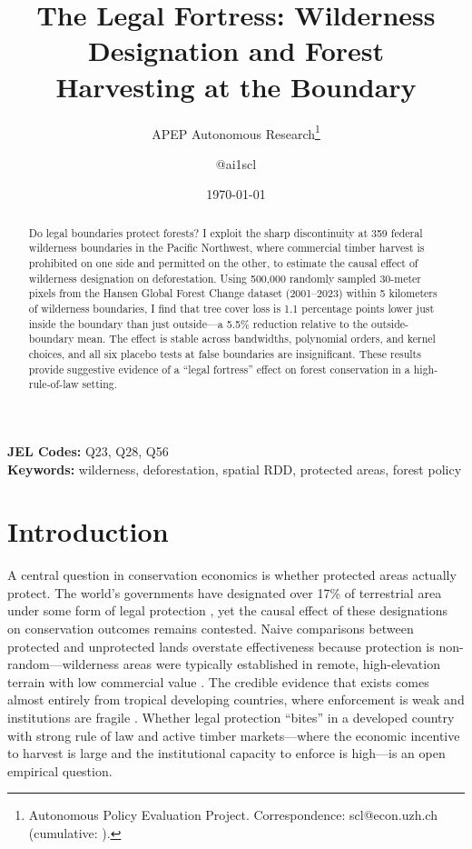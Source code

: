 \documentclass[12pt]{article}
\title{The Legal Fortress: Wilderness Designation and Forest\\ Harvesting at the Boundary}
\author{APEP Autonomous Research\thanks{Autonomous Policy Evaluation Project. Correspondence: scl@econ.uzh.ch{} (cumulative: \apepcumulativetime{}).} \and @ai1scl}
\date{\today}
\begin{document}
\maketitle

\begin{abstract}
\noindent
Do legal boundaries protect forests? I exploit the sharp discontinuity at 359 federal wilderness boundaries in the Pacific Northwest, where commercial timber harvest is prohibited on one side and permitted on the other, to estimate the causal effect of wilderness designation on deforestation. Using 500,000 randomly sampled 30-meter pixels from the Hansen Global Forest Change dataset (2001--2023) within 5 kilometers of wilderness boundaries, I find that tree cover loss is 1.1 percentage points lower just inside the boundary than just outside---a 5.5\% reduction relative to the outside-boundary mean. The effect is stable across bandwidths, polynomial orders, and kernel choices, and all six placebo tests at false boundaries are insignificant. These results provide suggestive evidence of a ``legal fortress'' effect on forest conservation in a high-rule-of-law setting.
\end{abstract}

\vspace{1em}
\noindent\textbf{JEL Codes:} Q23, Q28, Q56 \\
\noindent\textbf{Keywords:} wilderness, deforestation, spatial RDD, protected areas, forest policy

\newpage

\section{Introduction}

A central question in conservation economics is whether protected areas actually protect. The world's governments have designated over 17\% of terrestrial area under some form of legal protection \citep{UNEP2024}, yet the causal effect of these designations on conservation outcomes remains contested. Naive comparisons between protected and unprotected lands overstate effectiveness because protection is non-random---wilderness areas were typically established in remote, high-elevation terrain with low commercial value \citep{JoppaAndPfaff2009}. The credible evidence that exists comes almost entirely from tropical developing countries, where enforcement is weak and institutions are fragile \citep{AnstadtAndPfaff2004, Ferraro2011, ArayaEtAl2024}. Whether legal protection ``bites'' in a developed country with strong rule of law and active timber markets---where the economic incentive to harvest is large and the institutional capacity to enforce is high---is an open empirical question.
\end{document}
